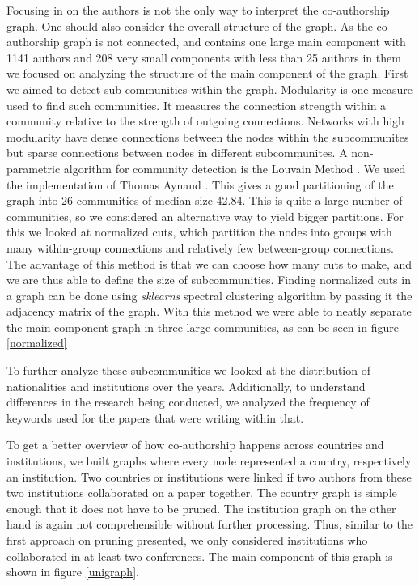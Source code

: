 \documentclass[article,twocolumn]{IEEEtran}
\begin{document}
    Focusing in on the authors is not the only way to interpret the
co-authorship graph. One should also consider the overall structure of
the graph. As the co-authorship graph is not connected, and contains one
large main component with 1141 authors and 208 very small components
with less than 25 authors in them we focused on analyzing the structure
of the main component of the graph. First we aimed to detect
sub-communities within the graph. Modularity is one measure used to find
such communities. It measures the connection strength within a community
relative to the strength of outgoing connections. Networks with high
modularity have dense connections between the nodes within the
subcommunites but sparse connections between nodes in different
subcommunites. A non-parametric algorithm for community detection is the
Louvain Method \cite{blondel2008fast}. We used the implementation of
Thomas Aynaud \cite{louvain}. This gives a good partitioning of the
graph into 26 communities of median size 42.84. This is quite a large
number of communities, so we considered an alternative way to yield
bigger partitions. For this we looked at normalized cuts, which
partition the nodes into groups with many within-group connections and
relatively few between-group connections. The advantage of this method
is that we can choose how many cuts to make, and we are thus able to
define the size of subcommunities. Finding normalized cuts in a graph
can be done using \emph{sklearns} spectral clustering algorithm by
passing it the adjacency matrix of the graph. With this method we were
able to neatly separate the main component graph in three large
communities, as can be seen in figure \ref{normalized}

    To further analyze these subcommunities we looked at the distribution of
nationalities and institutions over the years. Additionally, to
understand differences in the research being conducted, we analyzed the
frequency of keywords used for the papers that were writing within that.

To get a better overview of how co-authorship happens across countries
and institutions, we built graphs where every node represented a
country, respectively an institution. Two countries or institutions were
linked if two authors from these two institutions collaborated on a
paper together. The country graph is simple enough that it does not have
to be pruned. The institution graph on the other hand is again not
comprehensible without further processing. Thus, similar to the first
approach on pruning presented, we only considered institutions who
collaborated in at least two conferences. The main component of this
graph is shown in figure \ref{unigraph}.
\end{document}
